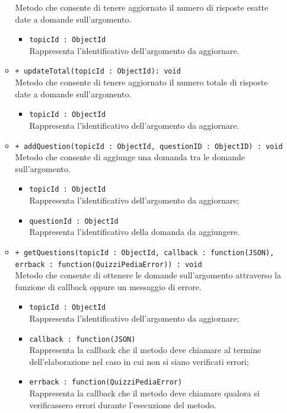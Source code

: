 \begin{itemize}
\begin{itemize}
			Metodo che consente di tenere aggiornato il numero di risposte esatte date a domande sull'argomento. \\
			\begin{itemize}
			\item \texttt{topicId : ObjectId} \\
			Rappresenta l'identificativo dell'argomento da aggiornare.
			\end{itemize}
			\item \texttt{+ updateTotal(topicId : ObjectId): void} \\
			Metodo che consente di tenere aggiornato il numero totale di risposte date a domande sull'argomento. \\
			\begin{itemize}
			\item \texttt{topicId : ObjectId} \\
			Rappresenta l'identificativo dell'argomento da aggiornare.
			\end{itemize}
			\item \texttt{+ addQuestion(topicId : ObjectId, questionID : ObjectID) : void} \\
			Metodo che consente di aggiunge una domanda tra le domande sull'argomento. \\
			\begin{itemize}
			\item \texttt{topicId : ObjectId} \\
			Rappresenta l'identificativo dell'argomento da aggiornare;
			\item \texttt{questionId : ObjectId} \\
			Rappresenta l'identificativo della domanda da aggiungere.
			\end{itemize}
			\item \texttt{+ getQuestions(topicId : ObjectId, callback : function(JSON), errback : function(QuizziPediaError)) : void} \\
			Metodo che consente di ottenere le domande sull'argomento attraverso la funzione di callback oppure un messaggio di errore. \\
			\begin{itemize}
			\item \texttt{topicId : ObjectId} \\
			Rappresenta l'identificativo dell'argomento da aggiornare;
			\item \texttt{callback : function(JSON)} \\
			Rappresenta la callback che il metodo deve chiamare al termine dell'elaborazione nel caso in cui non si siano verificati errori;
			\item \texttt{errback : function(QuizziPediaError)} \\
			Rappresenta la callback che il metodo deve chiamare qualora si verificassero errori durante l'esecuzione del metodo.
			\end{itemize}
		\end{itemize}
\end{itemize}